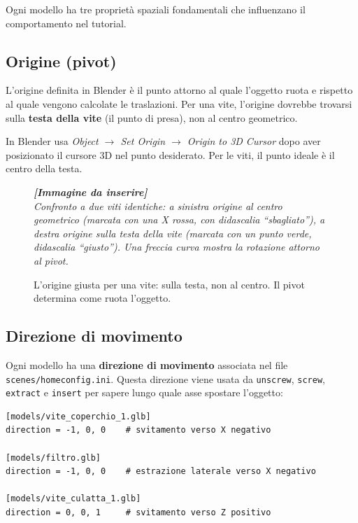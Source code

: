﻿\documentclass[a4paper,12pt,oneside]{book}
\newcommand{\val}[1]{\texttt{\color{cvtgreen}#1}}
\newcommand{\file}[1]{\texttt{#1}}
\newcommand{\imgph}[2]{%
  \begin{tcolorbox}[colback=cvtlightblue!30,colframe=cvtblue!40,%
    width=#1,halign=center,valign=center,height=5cm,boxrule=0.5pt,arc=3pt]%
    \textcolor{cvtgray}{\itshape\footnotesize\textbf{[Immagine da inserire]}\\[3pt]#2}%
  \end{tcolorbox}}
\begin{document}
Ogni modello ha tre proprietà spaziali fondamentali che influenzano il
comportamento nel tutorial.

\subsection{Origine (pivot)}

L'origine definita in Blender è il punto attorno al quale l'oggetto
ruota e rispetto al quale vengono calcolate le traslazioni. Per una
vite, l'origine dovrebbe trovarsi sulla \textbf{testa della vite}
(il punto di presa), non al centro geometrico.

\begin{trucchetto}
In Blender usa \emph{Object $\rightarrow$ Set Origin $\rightarrow$
Origin to 3D Cursor} dopo aver posizionato il cursore 3D nel punto
desiderato. Per le viti, il punto ideale è il centro della testa.
\end{trucchetto}

\begin{figure}[H]
  \centering
  \imgph{11cm}{Confronto a due viti identiche: a sinistra origine al centro geometrico (marcata con una X rossa, con didascalia ``sbagliato''), a destra origine sulla testa della vite (marcata con un punto verde, didascalia ``giusto''). Una freccia curva mostra la rotazione attorno al pivot.}
  \caption{L'origine giusta per una vite: sulla testa, non al centro. Il pivot determina come ruota l'oggetto.}
  \label{fig:origine-vite}
\end{figure}

\subsection{Direzione di movimento}

Ogni modello ha una \textbf{direzione di movimento} associata nel file
\file{scenes/homeconfig.ini}. Questa direzione viene usata da
\val{unscrew}, \val{screw}, \val{extract} e \val{insert} per sapere
lungo quale asse spostare l'oggetto:

\begin{lstlisting}
[models/vite_coperchio_1.glb]
direction = -1, 0, 0    # svitamento verso X negativo

[models/filtro.glb]
direction = -1, 0, 0    # estrazione laterale verso X negativo

[models/vite_culatta_1.glb]
direction = 0, 0, 1     # svitamento verso Z positivo
\end{lstlisting}
\end{document}
